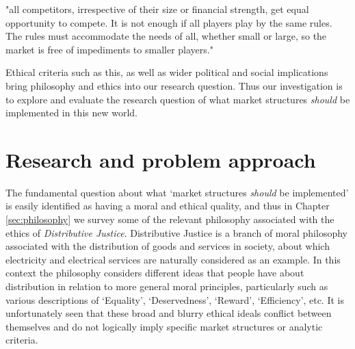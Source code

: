 "all competitors, irrespective of their size or financial strength, get equal opportunity to compete. It is not enough if all players play by the same rules. The rules must accommodate the needs of all, whether small or large, so the market is free of impediments to smaller players." \cite{australianenergymarketoperatorlimited2018}

Ethical criteria such as this, as well as wider political and social implications bring philosophy and ethics into our research question. 
Thus our investigation is to explore and evaluate the research question of what market structures \textit{should} be implemented in this new world.

\section{Research and problem approach}

The fundamental question about what `market structures \textit{should} be implemented' is easily identified as having a moral and ethical quality, and thus in Chapter \ref{sec:philosophy} we survey some of the relevant philosophy associated with the ethics of \textit{Distributive Justice}.
Distributive Justice is a branch of moral philosophy associated with the distribution of goods and services in society, about which electricity and electrical services are naturally considered as an example.
In this context the philosophy considers different ideas that people have about distribution in relation to more general moral principles, particularly such as various descriptions of `Equality', `Deservedness', `Reward', `Efficiency', etc.
It is unfortunately seen that these broad and blurry ethical ideals conflict between themselves and do not logically imply specific market structures or analytic criteria.


